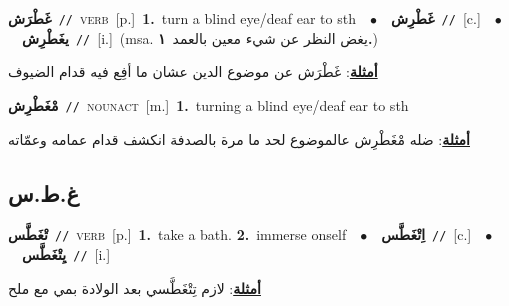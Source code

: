 \documentclass[10pt,a4paper,twoside]{article} %
\begin{document}
\begin{multicols}{2}
{\setlength\topsep{0pt}\textbf{\foreignlanguage{arabic}{غَطْرَش}}\ {\color{gray}\texttt{//}\color{black}}\ \textsc{verb}\ [p.]\ \textbf{1.}~turn a blind eye/deaf ear to sth\ \ $\bullet$\ \ \setlength\topsep{0pt}\textbf{\foreignlanguage{arabic}{غَطْرِش}}\ {\color{gray}\texttt{//}\color{black}}\ [c.]\ \ $\bullet$\ \ \setlength\topsep{0pt}\textbf{\foreignlanguage{arabic}{يغَطْرِش}}\ {\color{gray}\texttt{//}\color{black}}\ [i.]\ \color{gray}(msa. \foreignlanguage{arabic}{يغض النظر عن شيء معين بالعمد}~\foreignlanguage{arabic}{\textbf{١.}})\color{black}\  \begin{flushright}\color{gray}\foreignlanguage{arabic}{\textbf{\underline{\foreignlanguage{arabic}{أمثلة}}}: غَطْرَش عن موضوع الدين عشان ما أفِع فيه قدام الضيوف}\end{flushright}\color{black}} \vspace{2mm}

{\setlength\topsep{0pt}\textbf{\foreignlanguage{arabic}{مْغَطْرِش}}\ {\color{gray}\texttt{//}\color{black}}\ \textsc{noun\textunderscore act}\ [m.]\ \textbf{1.}~turning a blind eye/deaf ear to sth\  \begin{flushright}\color{gray}\foreignlanguage{arabic}{\textbf{\underline{\foreignlanguage{arabic}{أمثلة}}}: ضله مْغَطْرِش عالموضوع لحد ما مرة بالصدفة انكشف قدام عمامه وعمّاته}\end{flushright}\color{black}} \vspace{2mm}

\vspace{-3mm}
\subsection*{\color{blue}\foreignlanguage{arabic}{غ.ط.س}\color{blue}{}} 

{\setlength\topsep{0pt}\textbf{\foreignlanguage{arabic}{تْغَطَّس}}\ {\color{gray}\texttt{//}\color{black}}\ \textsc{verb}\ [p.]\ \textbf{1.}~take a bath.  \textbf{2.}~immerse onself\ \ $\bullet$\ \ \setlength\topsep{0pt}\textbf{\foreignlanguage{arabic}{اِتْغَطَّس}}\ {\color{gray}\texttt{//}\color{black}}\ [c.]\ \ $\bullet$\ \ \setlength\topsep{0pt}\textbf{\foreignlanguage{arabic}{يِتْغَطَّس}}\ {\color{gray}\texttt{//}\color{black}}\ [i.]\  \begin{flushright}\color{gray}\foreignlanguage{arabic}{\textbf{\underline{\foreignlanguage{arabic}{أمثلة}}}: لازم تِتْغَطَّسي بعد الولادة بمي مع ملح}\end{flushright}\color{black}} \vspace{2mm}


\end{multicols}
\end{document}

